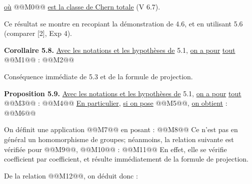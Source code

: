 
\uline{où} @@M0@@ \uline{est la
classe de Chern totale} (V 6.7).

Ce résultat se montre en recopiant la démonstration de 4.6, et en utilisant 5.6 (comparer [2], Exp 4).

\textbf{Corollaire 5.8.} \uline{Avec les notations et les hypothèses de} 5.1, \uline{on a pour} \uline{tout} @@M1@@ :
@@M2@@

Conséquence immédiate de 5.3 et de la formule de projection.

\textbf{Proposition 5.9.} \uline{Avec les notations et les hypothèses de} 5.1, \uline{on a pour} \uline{tout} @@M3@@ :
@@M4@@
\uline{En particulier}, \uline{si on pose} @@M5@@, \uline{on obtient} :
@@M6@@

On définit une application
@@M7@@
en posant :
@@M8@@
Ce n'est pas en général un homomorphisme de groupes; néanmoins, la relation suivante est vérifiée pour @@M9@@, @@M10@@ :
@@M11@@
En effet, elle se vérifie coefficient par coefficient, et résulte immédiatement de la formule de projection.

De la relation @@M12@@, on déduit donc :
